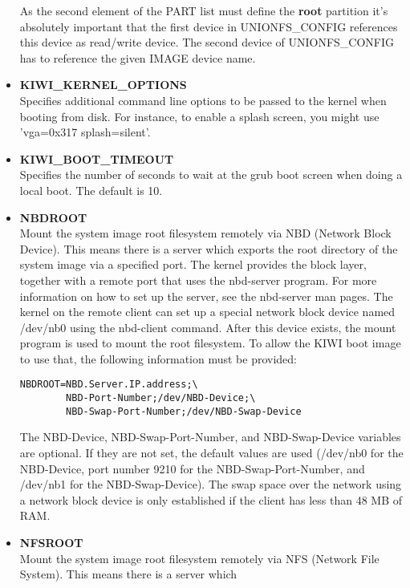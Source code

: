 \begin{itemize}
        As the second element of the PART list must define the \textbf{root}
        partition it's absolutely important that the first device in
        UNIONFS\_CONFIG references this device as read/write device.
        The second device of UNIONFS\_CONFIG has to reference the given
        IMAGE device name.
    \item \textbf{KIWI\_KERNEL\_OPTIONS}\\
        Specifies additional command line options to be passed to
        the kernel when booting from disk.  For instance, to enable
        a splash screen, you might use 'vga=0x317 splash=silent'.
    \item \textbf{KIWI\_BOOT\_TIMEOUT}\\
        Specifies the number of seconds to wait at the grub boot
        screen when doing a local boot.  The default is 10.
    \item \textbf{NBDROOT}\\
        Mount the system image root filesystem remotely via
        NBD (Network Block Device). This means there is a server
        which exports the root directory of the system image via a
        specified port. The kernel provides the block layer, together with a
        remote port that uses the nbd-server program. For more information
        on how to set up the server, see the nbd-server man pages. The
        kernel on the remote client can set up a special network block
        device named /dev/nb0 using the nbd-client command. After this
        device exists, the mount program is used to mount the root
        filesystem. To allow the KIWI boot image to use that, the following
        information must be provided:
\begin{verbatim}
NBDROOT=NBD.Server.IP.address;\
        NBD-Port-Number;/dev/NBD-Device;\
        NBD-Swap-Port-Number;/dev/NBD-Swap-Device
\end{verbatim}
        The NBD-Device, NBD-Swap-Port-Number, and NBD-Swap-Device
        variables are optional. If they are not set, the default values
        are used (/dev/nb0 for the NBD-Device, port number 9210 for the
        NBD-Swap-Port-Number, and /dev/nb1 for the NBD-Swap-Device).
        The swap space over the network using a network block device
        is only established if the client has less than 48 MB of RAM.
    \item \textbf{NFSROOT}\\
         Mount the system image root filesystem remotely via NFS
         (Network File System). This means there is a server which

\end{itemize}
